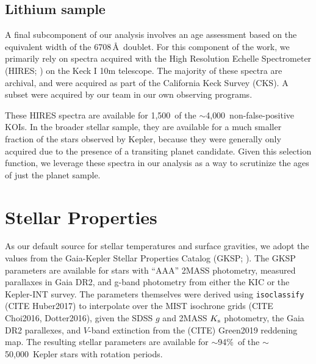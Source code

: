 \documentclass[11pt,twocolumn,tighten]{aastex63}
\newcommand{\nstarswithprot}{{$\sim$50{,}000}}
\newcommand{\fracstarswithprotwithbtwenty}{{$\sim$94\%}}
\newcommand{\fracstarswithprotwithoutbtwenty}{{$\sim$6\%}}
\newcommand{\nkoisnofp}{{$\sim$4{,}000}} %
\newcommand{\frackoisnofpwithprotwithbtwenty}{{$\sim$92\%}}
\newcommand{\nkoiswithhires}{{1{,}500}}
\begin{document}
\subsection{Lithium sample}
A final subcomponent of our analysis involves an age assessment based on
the equivalent width of the  6708\,\AA\ doublet.  For this
component of the work, we primarily rely on spectra acquired with the
High Resolution Echelle Spectrometer (HIRES;
\citealt{vogt_hires_1994}) on the Keck I 10m telescope.
The majority of these spectra are archival, and were acquired
as part of the California Keck Survey (CKS).
A subset were acquired by our team in our own observing programs.

These HIRES spectra are available for \nkoiswithhires\ of the
\nkoisnofp\ non-false-positive KOIs.
In the broader stellar sample, they are available for a much smaller 
fraction of the stars observed by Kepler, because they were generally only
acquired due to the presence of a transiting planet candidate.
Given this selection function,
we leverage these spectra in our analysis as a way to scrutinize the
ages of just the planet sample.



\section{Stellar Properties}


As our default source for stellar temperatures and surface gravities, we adopt
the values from the Gaia-Kepler Stellar Properties Catalog (GKSP;
\citealt{Berger_2020a_catalog}).
The GKSP parameters are available for stars with ``AAA'' 2MASS photometry,
measured parallaxes in Gaia DR2,  and g-band photometry from either the KIC or
the Kepler-INT survey.
The parameters themselves were derived using \texttt{isoclassify} (CITE
Huber2017) to interpolate over the MIST isochrone grids (CITE Choi2016,
Dotter2016), given the SDSS $g$ and 2MASS $K_{\rm s}$ photometry, the Gaia DR2
parallexes, and $V$-band extinction from the (CITE) Green2019 reddening map.
The resulting stellar parameters are available for
\fracstarswithprotwithbtwenty\ of the \nstarswithprot\ Kepler stars
with rotation periods.

\end{document}

